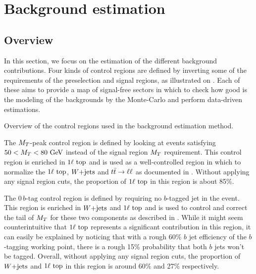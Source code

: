     \section{Background estimation \label{sec:analysis_backgroundEstimation}}

        \subsection{Overview}

    In this section, we focus on the estimation of the different background
    contributions.  Four kinds of control regions are defined by inverting some
    of the requirements of the preselection and signal regions, as illustrated
    on .  Each of these aims to provide
    a map of signal-free sectors in which to check how good is the modeling of
    the backgrounds by the Monte-Carlo and perform data-driven estimations.

                     {Overview of the control regions used in the background
                     estimation method.}

    The $M_T$-peak control region is defined by looking at events satisfying $50
    < M_T < 80~\text{GeV}$ instead of the signal region $M_T$ requirement. This control
    region is enriched in $1\ell~\text{top}$ and is used as a well-controlled
    region in which to normalize the $1\ell~\text{top}$, $\text{$W$+jets}$ and
    $t\bar{t} \rightarrow \ell \ell$ as documented in .
    Without applying any signal region cuts, the proportion of $1\ell~\text{top}$
    in this region is about 85\%.

    The $0\, b\text{-tag}$ control region is defined by requiring no $b$-tagged
    jet in the event. This region is enriched in $\text{$W$+jets}$ and $1\ell~\text{top}$
    and is used to control and correct the tail of $M_T$ for these two
    components as described in .  While it
    might seem counterintuitive that $1\ell~\text{top}$ represents a significant
    contribution in this region, it can easily be explained by noticing that
    with a rough 60\% $b$ jet efficiency of the $b$-tagging working point, there
    is a rough 15\% probability that both $b$ jets won't be tagged. Overall,
    without applying any signal region cuts, the proportion of $\text{$W$+jets}$ and
    $1\ell~\text{top}$ in this region is around 60\% and 27\% respectively.

